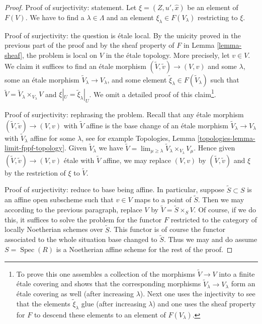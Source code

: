 \documentclass{stacks-project}
\theoremstyle{plain}
\theoremstyle{definition}
\theoremstyle{remark}
\numberwithin{equation}{subsection}
\def\lim{\mathop{\mathrm{lim}}\nolimits}
\def\Spec{\mathop{\mathrm{Spec}}}
\begin{document}
\begin{proof}
\medskip\noindent
Proof of surjectivity: statement.
Let $\xi = (Z, u', \hat x)$ be an element of $F(V)$.
We have to find a $\lambda \in \Lambda$ and an element
$\xi_\lambda \in F(V_\lambda)$ restricting to $\xi$.

\medskip\noindent
Proof of surjectivity: the question is \'etale local.
By the unicity proved in the previous part of the proof and by the
sheaf property of $F$ in Lemma \ref{lemma-sheaf}, the problem
is local on $V$ in the \'etale topology. More precisely, let $v \in V$.
We claim it suffices to find an \'etale morphism
$(\tilde V, \tilde v) \to (V, v)$ and some
$\lambda$, some an \'etale morphism $\tilde V_\lambda \to V_\lambda$,
and some element $\tilde \xi_\lambda \in F(\tilde V_\lambda)$ such that
$\tilde V = \tilde V_\lambda \times_{V_\lambda} V$
and $\xi|_U = \tilde \xi_\lambda|_U$. We omit a detailed proof of
this claim\footnote{To prove this
one assembles a collection of the morphisms $\tilde V \to V$
into a finite \'etale covering and shows that the corresponding morphisms
$\tilde V_\lambda \to V_\lambda$ form an \'etale covering as well (after
increasing $\lambda$). Next one uses the injectivity to see that
the elements $\tilde \xi_\lambda$ glue (after increasing $\lambda$)
and one uses the sheaf property for $F$ to descend these
elements to an element of $F(V_\lambda)$.}.

\medskip\noindent
Proof of surjectivity: rephrasing the problem.
Recall that any \'etale morphism $(\tilde V, \tilde v) \to (V, v)$
with $\tilde V$ affine is the base change of an \'etale morphism
$\tilde V_\lambda \to V_\lambda$ with $\tilde V_\lambda$ affine
for some $\lambda$, see for example
Topologies, Lemma \ref{topologies-lemma-limit-fppf-topology}.
Given $\tilde V_\lambda$ we have
$\tilde V = \lim_{\mu \geq \lambda} \tilde V_\lambda \times_{V_\lambda} V_\mu$.
Hence given $(\tilde V, \tilde v) \to (V, v)$ \'etale with $\tilde V$ affine,
we may replace $(V, v)$ by $(\tilde V, \tilde v)$ and $\xi$ by
the restriction of $\xi$ to $\tilde V$.

\medskip\noindent
Proof of surjectivity: reduce to base being affine. In particular,
suppose $\tilde S \subset S$ is an affine open subscheme such
that $v \in V$ maps to a point of $\tilde S$. Then we may according
to the previous paragraph, replace $V$ by $\tilde V = \tilde S \times_S V$.
Of course, if we do this, it suffices to solve the problem
for the functor $F$ restricted to the category of locally Noetherian
schemes over $\tilde S$. This functor is of course the functor
associated to the whole situation base changed to $\tilde S$.
Thus we may and do assume $S = \Spec(R)$ is a Noetherian affine scheme
for the rest of the proof.


\end{proof}
\end{document}

